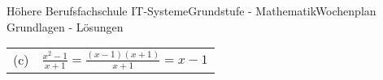 \documentclass[oneside,openany,headings=optiontotoc,11pt,numbers=noenddot]{scrreprt}
\begin{document}
\begin{worksheet}{Höhere Berufsfachschule IT-Systeme}{Grundstufe - Mathematik}{Wochenplan Grundlagen - Lösungen}
\begin{framed}
\begin{tabularx}{\textwidth}{lX}
				(c) & \(\frac{x^2-1}{x+1} = \frac{(x-1)(x+1)}{x+1} = x-1\)
			\end{tabularx}
		\end{framed}
	\end{worksheet}
\end{document}
